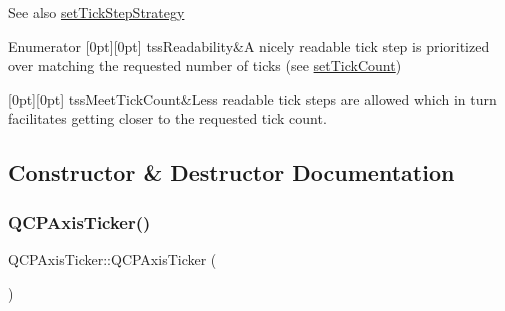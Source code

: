 \begin{DoxySeeAlso}{See also}
\hyperlink{class_q_c_p_axis_ticker_a73b1d847c1a12159af6bfda4ebebe7d5}{set\+Tick\+Step\+Strategy} 
\end{DoxySeeAlso}
\begin{DoxyEnumFields}{Enumerator}
[0pt][0pt]{}\mbox{\label{class_q_c_p_axis_ticker_ab6d2f9d9477821623ac9bc4b21ddf49aa9002aa2fd5633ab5556c71a26fed63a8}} 
tss\+Readability&A nicely readable tick step is prioritized over matching the requested number of ticks (see \hyperlink{class_q_c_p_axis_ticker_a47752abba8293e6dc18491501ae34008}{set\+Tick\+Count}) \\
\hline

[0pt][0pt]{}\mbox{\label{class_q_c_p_axis_ticker_ab6d2f9d9477821623ac9bc4b21ddf49aa770312b6b9b0c64a37ceeba96e0cd7f2}} 
tss\+Meet\+Tick\+Count&Less readable tick steps are allowed which in turn facilitates getting closer to the requested tick count. \\
\hline

\end{DoxyEnumFields}


\subsection{Constructor \& Destructor Documentation}
\mbox{\label{class_q_c_p_axis_ticker_a8fcf23c79ebd72202fe79253f9f01ea8}} 
\subsubsection{\texorpdfstring{Q\+C\+P\+Axis\+Ticker()}{QCPAxisTicker()}}
{\footnotesize\ttfamily Q\+C\+P\+Axis\+Ticker\+::\+Q\+C\+P\+Axis\+Ticker (\begin{DoxyParamCaption}{ }\end{DoxyParamCaption})}

